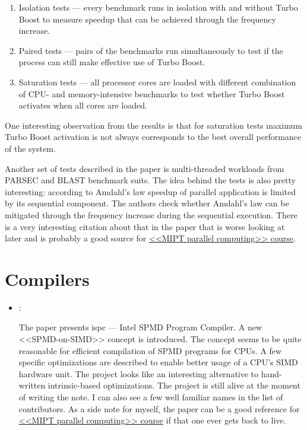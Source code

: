 \begin{itemize}
    \begin{enumerate}
        \item Isolation tests --- every benchmark runs in isolation with and without Turbo Boost to measure speedup that can be achieved through the frequency increase.
        \item Paired tests --- pairs of the benchmarks run simultaneously to test if the process can still make effective use of Turbo Boost.
        \item Saturation tests --- all processor cores are loaded with different combination of CPU- and memory-intensive benchmarks to test whether Turbo Boost activates when all cores are loaded.
    \end{enumerate}

    One interesting observation from the results is that for saturation tests maximum Turbo Boost activation is not always corresponds to the best overall performance of the system.

    Another set of tests described in the paper is multi-threaded workloads from PARSEC and BLAST benchmark suits. The idea behind the tests is also pretty interesting: according to Amdahl's law speedup of parallel application is limited by its sequential component. The authors check whether Amdahl's law can be mitigated through the frequency increase during the sequential execution. There is a very interesting citation about that in the paper that is worse looking at later and is probably a good source for \href{https://github.com/yulyugin/mipt-parallel-computing}{<<MIPT parallel computing>> course}.
\end{itemize}

\section*{Compilers}
\begin{itemize}
    \item \cite{Pharr:ispc:2012}:

    The paper presents ispc --- Intel SPMD Program Compiler. A new <<SPMD-on-SIMD>> concept is introduced. The concept seems to be quite reasonable for efficient compilation of SPMD programs for CPUs. A few specific optimizations are described to enable better usage of a CPU's SIMD hardware unit. The project looks like an interesting alternative to hand-written intrinsic-based optimizations. The project is still alive at the moment of writing the note. I can also see a few well familiar names in the list of contributors. As a side note for myself, the paper can be a good reference for \href{https://github.com/yulyugin/mipt-parallel-computing}{<<MIPT parallel computing>> course} if that one ever gets back to live.
\end{itemize}

